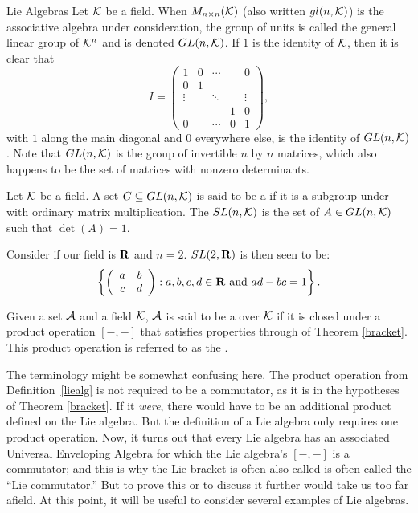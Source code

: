 \begin{section}{Lie Algebras}
Let $\mathcal{K}$ be a field.  When $M_{n \times n}(\mathcal{K})$ (also written $gl(n,\mathcal{K})$) is the associative algebra under consideration, the group of units is called the general linear group of $\mathcal{K} ^ n$ and is denoted $GL(n,\mathcal{K})$.  If $1$ is the identity of $\mathcal{K}$, then it is clear that
\[
I = 	\left(	\begin{array}{ccccc}
		1 	&0	&\cdots	&	&0 	\\
		0	&1	&	&	&	\\
		\vdots	&	&\ddots	&	&\vdots	\\
			&	&	&1	&0	\\
		0	&	&\cdots	&0	&1
\end{array} \right),
\]
with $1$ along the main diagonal and $0$ everywhere else, is the identity of $GL(n,\mathcal{K})$.  Note that $GL(n,\mathcal{K})$ is the group of invertible $n$ by $n$ matrices, which also happens to be the set of matrices with nonzero determinants.

\begin{definition}
\label{SL}
Let $\mathcal{K}$ be a field.  A set $G \subseteq GL(n,\mathcal{K})$ is said to be a  if it is a subgroup under with ordinary matrix multiplication.  The  $SL(n,\mathcal{K})$ is the set of $A \in GL(n,\mathcal{K})$ such that $\det(A) = 1$.
\end{definition}

Consider if our field is $\mathbf{R}$ and $n = 2$.  $SL(2,\mathbf{R})$ is then seen to be:
\[
\left\{	\left(	\begin{array}{cc}
		a 	& b 	\\
		c	& d
\end{array} \right) : a,b,c,d \in \mathbf{R} \mbox{ and } ad - bc = 1 \right\}.
\]

\begin{definition}
\label{liealg}
Given a set $\mathcal{A}$ and a field $\mathcal{K}$, $\mathcal{A}$ is said to be a  over $\mathcal{K}$ if it is closed under a product operation $[-,-]$ that satisfies properties  through  of Theorem \ref{bracket}.  This product operation is referred to as the .
\end{definition}

The terminology might be somewhat confusing here.  The product operation from Definition~\ref{liealg} is not required to be a commutator, as it is in the hypotheses of Theorem \ref{bracket}.  If it \emph{were}, there would have to be an additional product defined on the Lie algebra.  But the definition of a Lie algebra only requires one product operation.  Now, it turns out that every Lie algebra has an associated Universal Enveloping Algebra for which the Lie algebra's $[-,-]$ is a commutator; and this is why the Lie bracket is often also called is often called the ``Lie commutator.''  But to prove this or to discuss it further would take us too far afield.
	At this point, it will be useful to consider several examples of Lie algebras.


\end{section}
